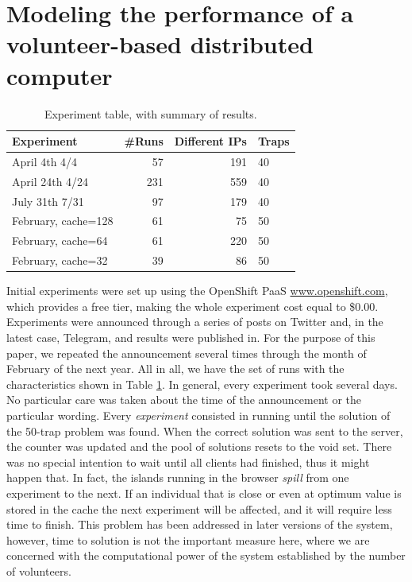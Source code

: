 \documentclass[letterpaper]{article}
\begin{document}
\section{Modeling the performance of a volunteer-based distributed computer} 
\label{sec:experiments}

\begin{table}[htb]
\caption{Experiment table, with summary of results. \label{tab:runs}}
\begin{center}
\begin{tabular}{l|rrl}
\hline
Experiment & \#Runs & Different IPs & Traps \\
\hline
April 4th 4/4 & 57 & 191 & 40 \\
April 24th 4/24 &  231 & 559& 40  \\
July 31th 7/31 & 97 & 179 & 40 \\
\hline
February, cache=128 & 61 & 75 & 50  \\
February, cache=64 & 61 & 220 & 50  \\
February, cache=32 & 39 & 86 & 50  \\
\hline
\end{tabular}
\end{center}
\end{table}
%
Initial experiments were set up using the OpenShift
PaaS \url{www.openshift.com}, which provides a free tier, making the whole experiment cost
equal to \$0.00. Experiments were
announced through a series of posts on Twitter and, in the latest case, Telegram, and
results were published in\citep{DBLP:conf/gecco/GuervosG15}. For the
purpose of this paper, we repeated the announcement several times
through the month of February of the next year. All  
in all, we have the set of runs with the characteristics shown in
Table \ref{tab:runs}. In general, every experiment took several
days. No particular care was taken about the time of the announcement
or the particular wording. Every {\em experiment} consisted in running
until the solution of the 50-trap problem was found. When the correct
solution was sent to the server, the counter was updated and the pool
of solutions resets to the void set. There was no special intention to wait
until all clients had finished, thus it might happen that. In fact,
the islands running in the browser {\em spill} from one experiment to
the next. 
If an individual that is close or even at optimum value is stored in the cache 
the next experiment will be affected, and it will require less time 
to finish. This problem has been addressed in later versions of the
system, however, time to solution is not the important measure here,
where we are concerned with the computational 
power of the system established by the number of volunteers. 
\end{document}

